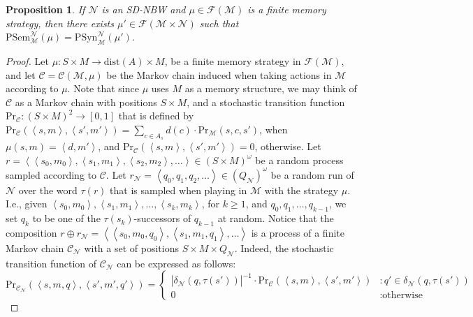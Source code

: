 \documentclass[10pt,a4paper]{amsart}
\newtheorem{prop}[thm]{Proposition}
\theoremstyle{definition}
\numberwithin{equation}{section}
\newcommand{\C}{{\mathcal C}}
\newcommand{\M}{{\mathcal M}}
\newcommand{\F}{{\mathcal F}}
\newcommand{\zug}[1]{\left\langle #1 \right\rangle}
\renewcommand{\Pr}{\mathrm{Pr}}
\newcommand{\dist}{\mathrm{dist}}
\newcommand{\N}{{\mathcal N}}
\begin{document}
\begin{prop}\label{sd unif str}
	If $\N$ is an SD-NBW and $\mu\in \F(\M)$ is a finite memory strategy, then there exists $\mu'\in \F(\M\times \N)$ such that $\mathrm{PSem}^\N_\M(\mu)=\mathrm{PSyn}^\N_\M(\mu')$.
\end{prop}

\begin{proof}
	Let $\mu:S\times M\rightarrow \dist(A)\times M$, be a finite memory strategy in $\F(\M)$, and let $\C=\C(\M,\mu)$ be the Markov chain induced when taking actions in $\M$ according to $\mu$. Note that since $\mu$ uses $M$ as a memory structure, we may think of $\C$ as a Markov chain with positions $S\times M$, and a stochastic transition function $\Pr_\C:(S\times M)^2\rightarrow[0,1]$ that is defined by $\Pr_\C(\zug{s,m},\zug{s',m'})=\sum_{c\in A_s}d(c) \cdot \Pr_{\M}(s,c,s')$, when $\mu(s,m)=\zug{d,m'}$, and $\Pr_\C(\zug{s,m},\zug{s',m'})=0$, otherwise. Let $r=\zug{\zug{s_0,m_0},\zug{s_1,m_1},\zug{s_2,m_2},\ldots} \in (S\times M)^\omega$ be a random process sampled according to $\C$. 
	Let $r_\N=\zug{q_0,q_1,q_2,\ldots} \in (Q_\N)^\omega$ be a random run of $\N$ over the word $\tau(r)$ that is sampled when playing in $\M$ with the strategy $\mu$. I.e., given $\zug{s_0,m_0},\zug{s_1,m_1},\ldots,\zug{s_k,m_k}$, for $k\geq 1$, and $q_0,q_1,\ldots,q_{k-1}$, we set $q_k$ to be one of the $\tau(s_k)$-successors of $q_{k-1}$ at random. Notice that the composition $r\oplus r_\N= \zug{\zug{s_0,m_0,q_0},\zug{s_1,m_1,q_1},\ldots}$ is a process of a finite Markov chain $\C_\N$ with a set of positions $S\times M\times Q_\N$. Indeed, the stochastic transition function of $\C_\N$ can be expressed as follows:
	\begin{equation*}
		\Pr_{\C_\N}(\zug{s,m,q},\zug{s',m',q'})=
		\begin{cases}
			|\delta_\N(q,\tau(s'))|^{-1}\cdot \Pr_\C(\zug{s,m},\zug{s',m'})&:q'\in \delta_\N(q,\tau(s'))\\
			0&:\mbox{otherwise}
		\end{cases}
	\end{equation*}  


\end{proof}
\end{document}
